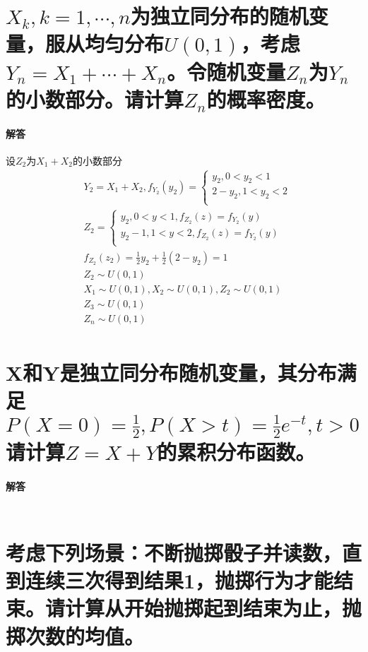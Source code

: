 \documentclass[UTF8]{ctexart}
\begin{document}
\section{$X_k,k=1,\cdots,n$为独立同分布的随机变量，服从均匀分布$U(0,1)$，考虑$Y_n=X_1+\cdots+X_n$。令随机变量$Z_n$为$Y_n$的小数部分。请计算$Z_n$的概率密度。}
\paragraph{解答}
设$Z_2$为$X_1+X_2$的小数部分\\
\begin{equation*}
\begin{aligned}
&Y_2=X_1+X_2,f_{Y_2}(y_2)=\begin{cases}
y_2,0<y_2<1\\
2-y_2,1<y_2<2\\
\end{cases}
\\
&Z_2=\begin{cases}
y_2,0<y<1,f_{Z_2}(z)=f_{Y_2}(y)\\
y_2-1,1<y<2,f_{Z_2}(z)=f_{Y_2}(y)\\
\end{cases}
\\
&f_{Z_2}(z_2)=\frac{1}{2}y_2+\frac{1}{2}(2-y_2)=1\\
&Z_2\sim U(0,1)\\
&X_1\sim U(0,1),X_2\sim U(0,1), Z_2\sim U(0,1)\\
&Z_3\sim U(0,1)\\
&Z_n\sim U(0,1)\\
\end{aligned}
\end{equation*}
\section{X和Y是独立同分布随机变量，其分布满足$P(X=0)=\frac{1}{2},P(X>t)=\frac{1}{2}e^{-t},t>0$请计算$Z=X+Y$的累积分布函数。}
\paragraph{解答}
\begin{equation*}
\begin{aligned}
\end{aligned}
\end{equation*}
\section{考虑下列场景：不断抛掷骰子并读数，直到连续三次得到结果1，抛掷行为才能结束。请计算从开始抛掷起到结束为止，抛掷次数的均值。}
\end{document}
